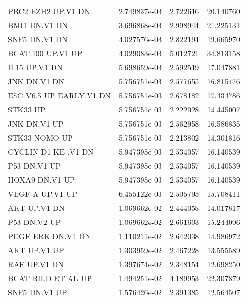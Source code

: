 \begin{tabular}{lrrr}
                PRC2 EZH2 UP.V1 DN &      2.749837e-03 &  2.722616 &       20.140760 \\
                     BMI1 DN.V1 DN &      3.696868e-03 &  2.998944 &       21.225131 \\
                     SNF5 DN.V1 DN &      4.027576e-03 &  2.822194 &       19.665970 \\
                 BCAT.100 UP.V1 UP &      4.029083e-03 &  5.012721 &       34.813158 \\
                     IL15 UP.V1 DN &      5.698659e-03 &  2.592519 &       17.047881 \\
                      JNK DN.V1 DN &      5.756751e-03 &  2.577655 &       16.815476 \\
           ESC V6.5 UP EARLY.V1 DN &      5.756751e-03 &  2.678182 &       17.434786 \\
                          STK33 UP &      5.756751e-03 &  2.222028 &       14.445007 \\
                      JNK DN.V1 UP &      5.756751e-03 &  2.562958 &       16.586835 \\
                     STK33 NOMO UP &      5.756751e-03 &  2.213802 &       14.301816 \\
               CYCLIN D1 KE .V1 DN &      5.947395e-03 &  2.534057 &       16.140539 \\
                      P53 DN.V1 UP &      5.947395e-03 &  2.534057 &       16.140539 \\
                    HOXA9 DN.V1 UP &      5.947395e-03 &  2.534057 &       16.140539 \\
                   VEGF A UP.V1 UP &      6.455122e-03 &  2.505795 &       15.708411 \\
                      AKT UP.V1 DN &      1.069662e-02 &  2.444058 &       14.017817 \\
                      P53 DN.V2 UP &      1.069662e-02 &  2.661603 &       15.244096 \\
                 PDGF ERK DN.V1 DN &      1.110211e-02 &  2.642038 &       14.986972 \\
                      AKT UP.V1 UP &      1.303959e-02 &  2.467228 &       13.555589 \\
                      RAF UP.V1 DN &      1.397674e-02 &  2.348154 &       12.698250 \\
                BCAT BILD ET AL UP &      1.494251e-02 &  4.189953 &       22.307879 \\
                     SNF5 DN.V1 UP &      1.576426e-02 &  2.391385 &       12.564507 \\

\end{tabular}
